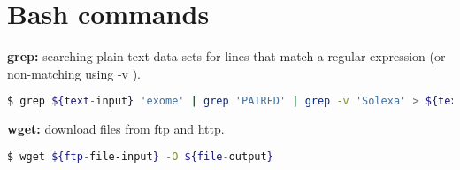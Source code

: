 \documentclass[8pt]{article}
\begin{document}
\section{Bash commands}

\textbf{grep:} searching plain-text data sets for lines that match a regular expression (or non-matching using -v ).
\begin{lstlisting}[language=bash]
$ grep ${text-input} 'exome' | grep 'PAIRED' | grep -v 'Solexa' > ${text-output}
\end{lstlisting}
\textbf{wget:} download files from ftp and http.
\begin{lstlisting}[language=bash]
$ wget ${ftp-file-input} -O ${file-output}
\end{lstlisting}
\end{document}
